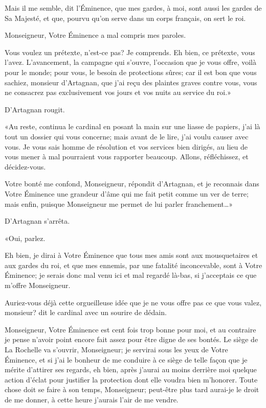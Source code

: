 \speak  Mais il me semble, dit l'Éminence, que mes gardes, à moi, sont aussi les gardes de Sa Majesté, et que, pourvu qu'on serve dans un corps français, on sert le roi. 

\speak  Monseigneur, Votre Éminence a mal compris mes paroles. 

\speak  Vous voulez un prétexte, n'est-ce pas? Je comprends. Eh bien, ce prétexte, vous l'avez. L'avancement, la campagne qui s'ouvre, l'occasion que je vous offre, voilà pour le monde; pour vous, le besoin de protections sûres; car il est bon que vous sachiez, monsieur d'Artagnan, que j'ai reçu des plaintes graves contre vous, vous ne consacrez pas exclusivement vos jours et vos nuits au service du roi.» 

D'Artagnan rougit. 

«Au reste, continua le cardinal en posant la main sur une liasse de papiers, j'ai là tout un dossier qui vous concerne; mais avant de le lire, j'ai voulu causer avec vous. Je vous sais homme de résolution et vos services bien dirigés, au lieu de vous mener à mal pourraient vous rapporter beaucoup. Allons, réfléchissez, et décidez-vous. 

\speak  Votre bonté me confond, Monseigneur, répondit d'Artagnan, et je reconnais dans Votre Éminence une grandeur d'âme qui me fait petit comme un ver de terre; mais enfin, puisque Monseigneur me permet de lui parler franchement\dots» 

D'Artagnan s'arrêta. 

«Oui, parlez. 

\speak  Eh bien, je dirai à Votre Éminence que tous mes amis sont aux mousquetaires et aux gardes du roi, et que mes ennemis, par une fatalité inconcevable, sont à Votre Éminence; je serais donc mal venu ici et mal regardé là-bas, si j'acceptais ce que m'offre Monseigneur. 

\speak  Auriez-vous déjà cette orgueilleuse idée que je ne vous offre pas ce que vous valez, monsieur? dit le cardinal avec un sourire de dédain. 

\speak  Monseigneur, Votre Éminence est cent fois trop bonne pour moi, et au contraire je pense n'avoir point encore fait assez pour être digne de ses bontés. Le siège de La Rochelle va s'ouvrir, Monseigneur; je servirai sous les yeux de Votre Éminence, et si j'ai le bonheur de me conduire à ce siège de telle façon que je mérite d'attirer ses regards, eh bien, après j'aurai au moins derrière moi quelque action d'éclat pour justifier la protection dont elle voudra bien m'honorer. Toute chose doit se faire à son temps, Monseigneur; peut-être plus tard aurai-je le droit de me donner, à cette heure j'aurais l'air de me vendre. 

